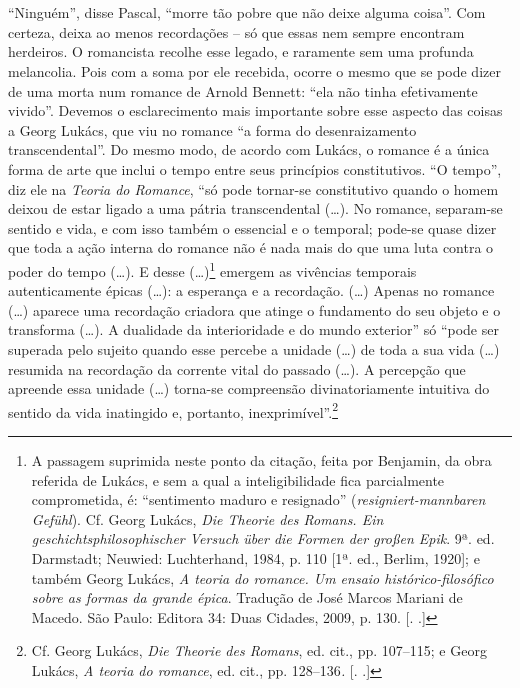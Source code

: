 \section{}

``Ninguém'', disse Pascal, ``morre tão pobre que não deixe alguma
coisa''. Com certeza, deixa ao menos recordações -- só que essas nem
sempre encontram herdeiros. O romancista recolhe esse legado, e
raramente sem uma profunda melancolia. Pois com a soma por ele recebida,
ocorre o mesmo que se pode dizer de uma morta num romance de Arnold
Bennett: ``ela não tinha efetivamente vivido''. Devemos o esclarecimento
mais importante sobre esse aspecto das coisas a Georg Lukács, que viu no
romance ``a forma do desenraizamento transcendental''. Do mesmo modo, de
acordo com Lukács, o romance é a única forma de arte que inclui o tempo
entre seus princípios constitutivos. ``O tempo'', diz ele na
\emph{Teoria do Romance}, ``só pode tornar-se constitutivo quando o
homem deixou de estar ligado a uma pátria transcendental (\ldots{}). No
romance, separam-se sentido e vida, e com isso também o essencial e o
temporal; pode-se quase dizer que toda a ação interna do romance não é
nada mais do que uma luta contra o poder do tempo (\ldots{}). E desse
(\ldots{})\footnote{A passagem suprimida neste ponto da citação, feita por
  Benjamin, da obra referida de Lukács, e sem a qual a inteligibilidade
  fica parcialmente comprometida, é: ``sentimento maduro e resignado''
  (\emph{resigniert-mannbaren Gefühl}). Cf. Georg Lukács, \emph{Die
  Theorie des Romans. Ein geschichtsphilosophischer Versuch über die
  Formen der großen Epik}. 9ª. ed. Darmstadt; Neuwied: Luchterhand,
  1984, p. 110 [1ª. ed., Berlim, 1920]; e também Georg Lukács,
  \emph{A teoria do romance. Um ensaio histórico-filosófico sobre as
  formas da grande épica}. Tradução de José Marcos Mariani de Macedo.
  São Paulo: Editora 34: Duas Cidades, 2009, p. 130. [. .]}
emergem as vivências temporais autenticamente épicas (\ldots{}): a
esperança e a recordação. (\ldots{}) Apenas no romance (\ldots{}) aparece uma
recordação criadora que atinge o fundamento do seu objeto e o transforma
(\ldots{}). A dualidade da interioridade e do mundo exterior'' só ``pode ser
superada pelo sujeito quando esse percebe a unidade (\ldots{}) de toda a sua
vida (\ldots{}) resumida na recordação da corrente vital do passado (\ldots{}). A
percepção que apreende essa unidade (\ldots{}) torna-se compreensão
divinatoriamente intuitiva do sentido da vida inatingido e, portanto,
inexprimível''.\footnote{Cf. Georg Lukács, \emph{Die Theorie des
  Romans}, ed. cit., pp. 107--115; e Georg Lukács, \emph{A teoria do
  romance}, ed. cit., pp. 128--136\emph{.} [. .]}

